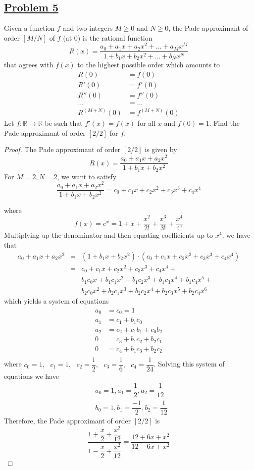 \documentclass[10pt,letterpaper]{article}
\begin{document}
	\subsection*{{\color{purple}\underline{Problem 5}}}
	Given a function $f$ and two integers $M \geq 0$ and $N \geq 0$, the Pade approximant of order $[M/N]$
	of $f$ (at $0$) is the rational function
	$$R(x) = \dfrac{a_0 + a_1x + a_2x^2 + \ldots + a_Mx^M}{
	1 + b_1x + b_2x^2 + \ldots + b_Nx^N}$$
	that agrees with $f(x)$ to the highest possible order which amounts to 
	\begin{align*}
		R(0)   &= f(0) \\
		R'(0)  &= f'(0) \\
		R''(0) &= f''(0) \\
		\ldots &= \ldots \\
		R^{(M + N)}(0) &= f^{(M + N)}(0)	
	\end{align*}
	Let $f: \mathbb{R} \rightarrow \mathbb{R}$ be such that $f'(x) = f(x)$ for all $x$ and $f(0) = 1$.
	Find the Pade approximant of order $[2/2]$ for $f$. 
	\begin{proof}
	The Pade approximant of order $[2/2]$ is given by
	$$R(x) = \dfrac{a_0 + a_1x + a_2x^2}{1 + b_1x + b_2x^2}$$
	For $M = 2, N = 2$, we want to satisfy
	$$
	 \dfrac{a_0 + a_1x + a_2x^2}{1 + b_1x + b_2x^2} = 
	 c_0 + c_1x + c_2x^2 + c_3x^3 + c_4x^4$$
	 
	where 
	$$f(x) = e^x = 
	1 + x + \dfrac{x^2}{2!} + \dfrac{x^3}{3!} + \dfrac{x^4}{4!}$$
 	Multiplying up the denominator and then equating coefficients up to $x^4$, we have that
\begin{align*} 
 a_0 + a_1x + a_2x^2 
&=& (1 + b_1x + b_2x^2) \cdot (c_0 + c_1x + c_2x^2 + c_3x^3 + c_4x^4) \\
&=& c_0 + c_1x + c_2x^2 + c_3x^3 + c_4x^4 + \\
& & b_1c_0x + b_1c_1x^2 + b_1c_2x^3 + b_1c_3x^4 + b_1c_4x^5 + \\
& & b_2c_0x^2 + b_2c_1x^3 + b_2c_2x^4 + b_2c_3x^5 + b_2c_4x^6
\end{align*}
	which yields a system of equations
 	\begin{align*}
		a_0 &= c_0 = 1 \\ 	
		a_1 &= c_1 + b_1c_0 \\
		a_2 &= c_2 + c_1b_1 + c_0b_2\\
		0   &= c_3 + b_1c_2 + b_2c_1 \\
		0   &= c_4 + b_1c_3 + b_2c_2  \\
 	\end{align*}
 	where 
 		$c_0 = 1 , \,\,\,\, c_1 = 1 , \,\,\,\, c_2 = \dfrac{1}{2}
 		, \,\,\,\, c_3 = \dfrac{1}{6}, \,\,\,\, c_4 = \dfrac{1}{24} $.
 	Solving this system of equations we have 
 	\begin{align*}
 		&  a_0 = 1, a_1 = \dfrac{1}{2}, a_2 = \dfrac{1}{12} \\
 		&  b_0 = 1, b_1 = \dfrac{-1}{2}, b_2 = \dfrac{1}{12} 
 	\end{align*}
	Therefore, the Pade approximant of order $[2/2]$ is
	$$
	\dfrac{1 + \dfrac{x}{2} + \dfrac{x^2}{12}}{1 - \dfrac{x}{2} + \dfrac{x^2}{12}} = 
	\dfrac{12 + 6x + x^2}{12 - 6x + x^2}
	$$
	\end{proof}
	
\end{document}
